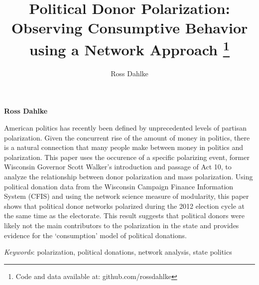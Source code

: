\documentclass[12pt,]{article}
\title{Political Donor Polarization: Observing Consumptive Behavior using a
Network Approach \thanks{Code and data available at: github.com/rossdahlke}  }
\author{\Large Ross Dahlke\vspace{0.05in} \newline\normalsize\emph{}  }
\date{}
\newcommand*{\authorfont}{\fontfamily{phv}\selectfont}
\renewenvironment{abstract}
 {{%
    \setlength{\leftmargin}{0mm}
    \setlength{\rightmargin}{\leftmargin}%
  }%
  \relax}
 {\endlist}
\begin{document}
	
%

{%
\setlength{\parindent}{0pt}
\thispagestyle{plain}
{\fontsize{18}{20}\selectfont\raggedright 
\maketitle  %

}

{
   \vskip 13.5pt\relax \normalsize\fontsize{11}{12} 
\textbf{\authorfont Ross Dahlke} \hskip 15pt \emph{\small }   

}

}








\begin{abstract}

    \hbox{\vrule height .2pt width 39.14pc}

    \vskip 8.5pt %

\noindent American politics has recently been defined by unprecedented levels of
partisan polarization. Given the concurrent rise of the amount of money
in politics, there is a natural connection that many people make between
money in politics and polarization. This paper uses the occurence of a
specific polarizing event, former Wisconsin Governor Scott Walker's
introduction and passage of Act 10, to analyze the relationship between
donor polarization and mass polarization. Using political donation data
from the Wisconsin Campaign Finance Information System (CFIS) and using
the network science measure of modularity, this paper shows that
political donor networks polarized during the 2012 election cycle at the
same time as the electorate. This result suggests that political donors
were likely not the main contributors to the polarization in the state
and provides evidence for the `consumption' model of political
donations.


\vskip 8.5pt \noindent \emph{Keywords}: polarization, political donations, network analysis, state politics \par

    \hbox{\vrule height .2pt width 39.14pc}



\end{abstract}
\end{document}
